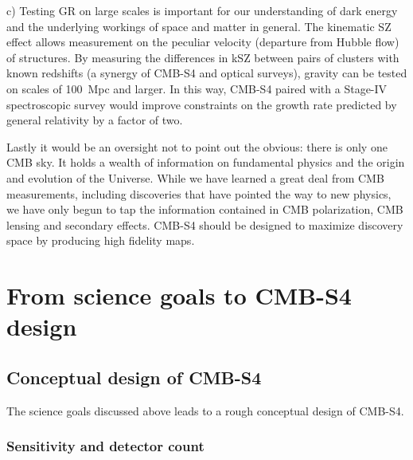 \begin{enumerate}
{ c) Testing GR on large scales is important for our understanding of dark energy and the underlying workings of space and matter in general.  The kinematic SZ effect allows measurement on the peculiar velocity (departure from Hubble flow) of structures. By measuring the differences in kSZ between pairs of clusters with known redshifts (a synergy of CMB-S4 and optical surveys), gravity can be tested on scales of 100~Mpc and larger. In this way, CMB-S4 paired with a Stage-IV spectroscopic survey would improve constraints on the growth rate predicted by general relativity by a factor of two.
 }

\end{enumerate}

Lastly it would be an oversight not to point out the obvious: there is only one CMB sky. It holds a wealth of information on fundamental physics and the origin and evolution of the Universe. While we have learned a great deal from CMB measurements, including discoveries that have pointed the way to new physics, we have only begun to tap the information contained in CMB polarization, CMB lensing and secondary effects. CMB-S4 should be designed to maximize discovery space by producing high fidelity maps. 

\section{From science goals to CMB-S4 design}


\subsection{Conceptual design of CMB-S4}

The science goals discussed above leads to a rough conceptual design of CMB-S4.

\subsubsection{Sensitivity and detector count}

